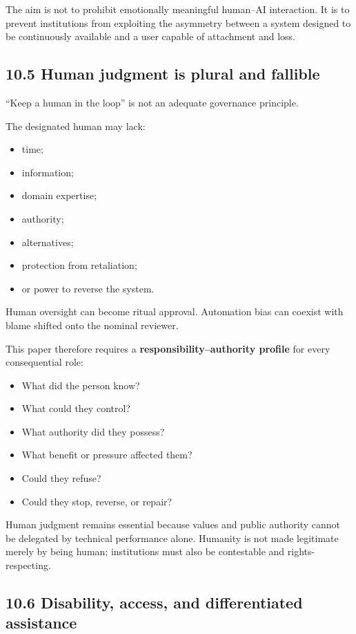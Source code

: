 \documentclass[
  11pt,
]{article}
\providecommand{\tightlist}{%
  \setlength{\itemsep}{0pt}\setlength{\parskip}{0pt}}
\begin{document}
The aim is not to prohibit emotionally meaningful human--AI interaction.
It is to prevent institutions from exploiting the asymmetry between a
system designed to be continuously available and a user capable of
attachment and loss.

\subsection{10.5 Human judgment is plural and
fallible}\label{human-judgment-is-plural-and-fallible}

``Keep a human in the loop'' is not an adequate governance principle.

The designated human may lack:

\begin{itemize}
\tightlist
\item
  time;
\item
  information;
\item
  domain expertise;
\item
  authority;
\item
  alternatives;
\item
  protection from retaliation;
\item
  or power to reverse the system.
\end{itemize}

Human oversight can become ritual approval. Automation bias can coexist
with blame shifted onto the nominal reviewer.

This paper therefore requires a \textbf{responsibility--authority
profile} for every consequential role:

\begin{itemize}
\tightlist
\item
  What did the person know?
\item
  What could they control?
\item
  What authority did they possess?
\item
  What benefit or pressure affected them?
\item
  Could they refuse?
\item
  Could they stop, reverse, or repair?
\end{itemize}

Human judgment remains essential because values and public authority
cannot be delegated by technical performance alone. Humanity is not made
legitimate merely by being human; institutions must also be contestable
and rights-respecting.

\subsection{10.6 Disability, access, and differentiated
assistance}\label{disability-access-and-differentiated-assistance}
\end{document}
